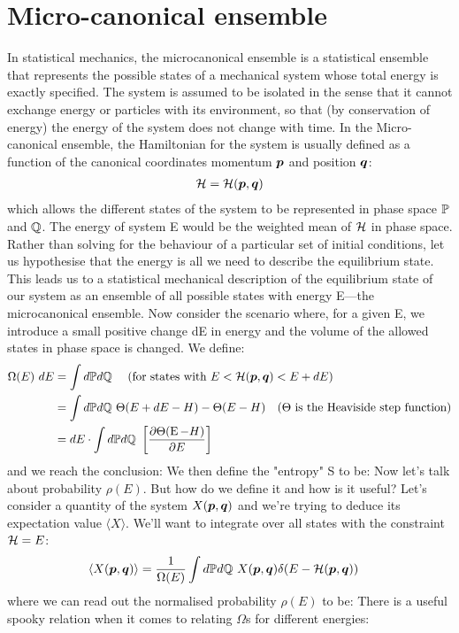 \documentclass{report}
\begin{document}
\section{Micro-canonical ensemble}
In statistical mechanics, the microcanonical ensemble is a statistical ensemble that represents the possible states of a mechanical system whose total energy is exactly specified. The system is assumed to be isolated in the sense that it cannot exchange energy or particles with its environment, so that (by conservation of energy) the energy of the system does not change with time. In the Micro-canonical ensemble, the Hamiltonian for the system is usually defined as a function of the canonical coordinates momentum $\boldsymbol{p}$ and position $\boldsymbol{q}$:
\begin{align}
    \mathcal H = \mathcal H (\boldsymbol{p}, \boldsymbol{q})
\end{align}
which allows the different states of the system to be represented in phase space $\PP$ and $\QQ$. The energy of system E would be the weighted mean of $\mathcal H$ in phase space. Rather than solving for the behaviour of a particular set of initial conditions, let us hypothesise that the energy is all we need to describe the equilibrium state. This leads us to a statistical mechanical description of the equilibrium state of our system as an ensemble of all possible states with energy E—the microcanonical ensemble.
Now consider the scenario where, for a given E, we introduce a small positive change dE in energy and the volume of the allowed states in phase space is changed. We define:
\begin{align}
    \Omega(E)\ dE & = \intphase \quad (\text{for states with } E <  \ham < E + dE)                             \\
                  & =\intphase \Theta(E+dE-H)-\Theta(E-H) \quad (\Theta\text{ is the Heaviside step function}) \\
                  & =d E \cdot \intphase \left[\frac{\partial\Theta(\E-H)}{\partial E}\right]                  \\
\end{align}
and we reach the conclusion:
\noindent We then define the "entropy" S to be:
Now let's talk about probability $\rho(E)$. But how do we define it and how is it useful? Let's consider a quantity of the system $X(\boldsymbol{p}, \boldsymbol{q})$ and we're trying to deduce its expectation value $\langle X \rangle$. We'll want to integrate over all states with the constraint $\mathcal H = E$:
\begin{align}
    \langle X(\bmp, \bmq) \rangle & = \frac{1}{\Omega(E)}\intphase X(\bmp, \bmq) \delta(E - \ham)
\end{align}
where we can read out the normalised probability $\rho(E)$ to be:
\noindent There is a useful spooky relation when it comes to relating $\Omega$s for different energies:
\end{document}

